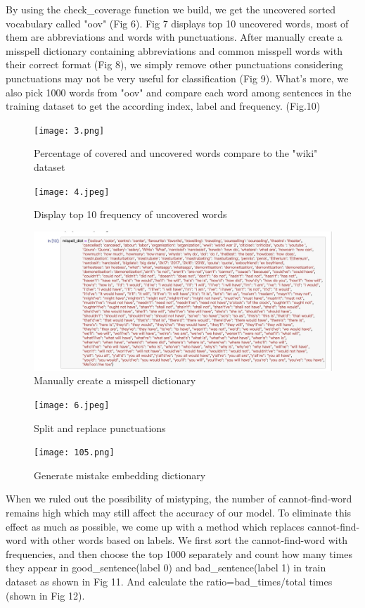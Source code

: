 \documentclass{article}
\begin{document}
\noindent By using the check\_coverage function we build, we get the uncovered sorted vocabulary called "oov" (Fig 6). Fig 7 displays top 10 uncovered words, most of them are abbreviations and words with punctuations. After manually create a misspell dictionary containing abbreviations and common misspell words with their correct format (Fig 8), we simply remove other punctuations considering punctuations may not be very useful for classification (Fig 9). What's more, we also pick 1000 words from "oov" and compare each word among sentences in the training dataset to get the according index, label and frequency. (Fig.10)\\

\begin{figure}[H]
	\centering
	\texttt{[image: 3.png]} %
	\caption{Percentage of covered and uncovered words compare to the "wiki" dataset}
\end{figure}
\begin{figure}[H]
	\centering
	\texttt{[image: 4.jpeg]} %
	\caption{Display top 10 frequency of uncovered words}
\end{figure}
\begin{figure}[H] %
	\centering
	\includegraphics[scale = 0.15]{mis.jpeg} %
	\caption{Manually create a misspell dictionary}
\end{figure}
\begin{figure}[H]
	\centering
	\texttt{[image: 6.jpeg]} %
	\caption{Split and replace punctuations}
\end{figure}
\begin{figure}[H]
	\centering
	\texttt{[image: 105.png]} %
	\caption{Generate mistake embedding dictionary}
\end{figure}
\noindent When we ruled out the possibility of mistyping, the number of cannot-find-word remains high which may still affect the accuracy of our model. To eliminate this effect as much as possible, we come up with a method which replaces cannot-find-word with other words based on labels. We first sort the cannot-find-word with frequencies, and then choose the top 1000 separately and count how many times they appear in good\_sentence(label 0) and bad\_sentence(label 1) in train dataset as shown in Fig 11. And calculate the ratio=bad\_times/total times (shown in Fig 12).
\end{document}
